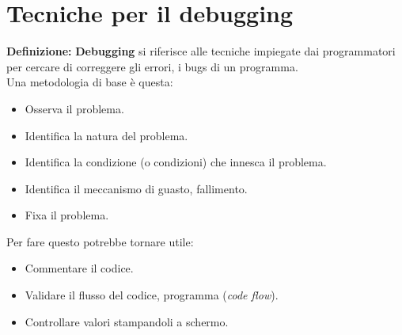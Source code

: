 
\newpage

\section{Tecniche per il debugging}

\textsf{\small \textbf{Definizione: } \textbf{Debugging} si riferisce alle tecniche impiegate dai programmatori per cercare di correggere gli errori, i bugs di un programma.} \\

\textsf{\small Una metodologia di base è questa: } \\

\begin{itemize}
	\item \textsf{\small Osserva il problema.}
	\item \textsf{\small Identifica la natura del problema.}
	\item \textsf{\small Identifica la condizione (o condizioni) che innesca il problema.}
	\item \textsf{\small Identifica il meccanismo di guasto, fallimento.}
	\item \textsf{\small Fixa il problema.}
\end{itemize}

\textsf{\small Per fare questo potrebbe tornare utile: } \\

\begin{itemize}
	\item \textsf{\small Commentare il codice.}
	\item \textsf{\small Validare il flusso del codice, programma (\emph{code flow}).}
	\item \textsf{\small Controllare valori stampandoli a schermo.}
\end{itemize}






